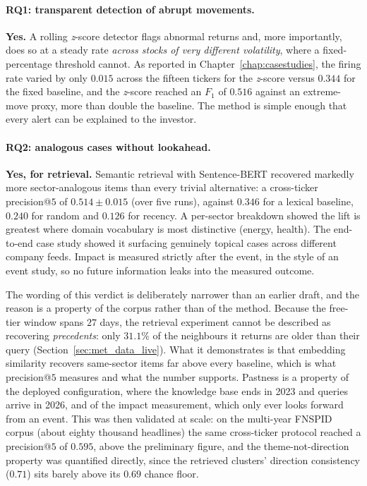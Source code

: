 \paragraph{RQ1: transparent detection of abrupt movements.}
\textbf{Yes.} A rolling \emph{z}-score detector flags abnormal returns and, more importantly, does
so at a steady rate \emph{across stocks of very different volatility}, where a fixed-percentage threshold
cannot. As reported in
Chapter~\ref{chap:casestudies}, the firing rate varied by only $0.015$ across the fifteen tickers for the
\emph{z}-score versus $0.344$ for the fixed baseline, and the \emph{z}-score reached an $F_1$ of $0.516$
against an extreme-move proxy, more than double the baseline. The method is simple enough that every
alert can be explained to the investor.

\paragraph{RQ2: analogous cases without lookahead.}
\textbf{Yes, for retrieval.} Semantic retrieval with Sentence-BERT recovered markedly more
sector-analogous items than every trivial alternative: a cross-ticker precision@$5$ of
$0.514 \pm 0.015$ (over five runs), against $0.346$ for a lexical baseline, $0.240$ for random and $0.126$
for recency. A per-sector breakdown showed the lift is greatest where domain vocabulary is most
distinctive (energy, health). The end-to-end case study showed it surfacing genuinely topical cases across
different company feeds. Impact is measured strictly after the event, in the style of an event study, so
no future information leaks into the measured outcome.

The wording of this verdict is deliberately narrower than an earlier draft, and the reason is a
property of the corpus rather than of the method. Because the free-tier window spans $27$ days, the
retrieval experiment cannot be described as recovering \emph{precedents}: only $31.1\%$ of the
neighbours it returns are older than their query (Section~\ref{sec:met_data_live}). What it
demonstrates is that embedding similarity recovers same-sector items far above every baseline, which
is what precision@$5$ measures and what the number supports. Pastness is a property of the deployed
configuration, where the knowledge base ends in 2023 and queries arrive in 2026, and of the impact
measurement, which only ever looks forward from an event. This was then validated at scale: on the multi-year
FNSPID corpus (about eighty thousand headlines) the same cross-ticker protocol reached a
precision@$5$ of $0.595$, above the preliminary figure, and the theme-not-direction property was
quantified directly, since the retrieved clusters' direction consistency ($0.71$) sits barely above
its $0.69$ chance floor.

